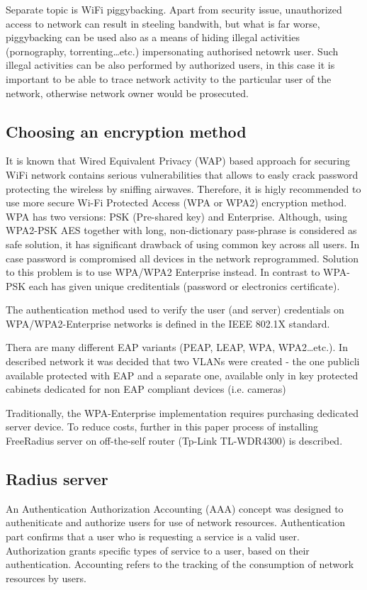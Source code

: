 \documentclass{llncs}
\begin{document}
Separate topic is WiFi piggybacking. Apart from security issue,
unauthorized access to network can result in steeling bandwith, but what is far
worse, piggybacking can be used also as a means of hiding illegal activities
(pornography, torrenting\ldots etc.) impersonating authorised netowrk user. Such
illegal activities can be also performed by authorized users, in this case it is
important to be able to trace network activity to the particular user of the
network, otherwise network owner would be prosecuted. 

\subsection{Choosing an encryption method}
It is known that Wired Equivalent Privacy (WAP) based approach for
securing WiFi network contains serious vulnerabilities that allows to
easly crack password protecting the wireless by sniffing airwaves.
Therefore, it is higly recommended to use more secure Wi-Fi Protected Access
(WPA or WPA2) encryption method. WPA has two versions: PSK
(Pre-shared key) and Enterprise. Although, using WPA2-PSK AES together
with long, non-dictionary pass-phrase is considered as safe solution, it has
significant drawback of using common key across all users.
In case password is compromised all devices in the
network reprogrammed. Solution to this problem is to use WPA/WPA2 Enterprise
instead. In contrast to WPA-PSK each has given unique creditentials
(password or electronics certificate). 

The authentication method used to verify the user (and server) credentials on
WPA/WPA2-Enterprise networks is defined in the IEEE 802.1X standard.

Thera are many different EAP variants (PEAP, LEAP, WPA, WPA2\ldots etc.). In
described network it was decided that two VLANs were created - the one
publicli available protected with EAP and a separate one, available only in
key protected cabinets dedicated for non EAP compliant devices (i.e. cameras)
 
 Traditionally, the WPA-Enterprise
implementation requires purchasing dedicated server device. To reduce
costs, further in this paper process of installing FreeRadius server on
off-the-self router (Tp-Link TL-WDR4300) is described.

\subsection{Radius server}
An Authentication Authorization Accounting (AAA) \cite{rfc2903}\cite{rfc2904}
concept was designed to autheniticate and authorize users for use of network
resources. Authentication part confirms that a user who is requesting a service
is a valid user. Authorization grants specific types of service to a user, based
on their authentication. Accounting refers to the tracking of the consumption of
network resources by users.
\end{document}
